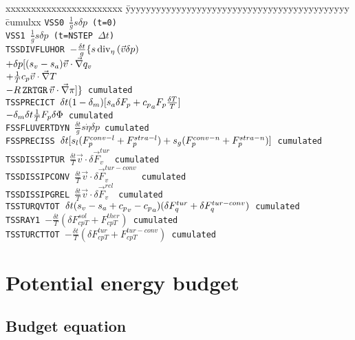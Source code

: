\begin{tabbing}
xxxxxxxxxxxxxxxxxxxxxxx \= yyyyyyyyyyyyyyyyyyyyyyyyyyyyyyyyyyyyyyyyyyyy \= cumulxx \kill
\tt VSS0         \> $\frac{1}{g} s \delta p$ (t=0) \\[1ex]
\tt VSS1         \> $\frac{1}{g} s \delta p$ (t=NSTEP $\Delta t$) \\[1ex]
\tt TSSDIVFLUHOR \> $-\frac{\delta t}{g}\{s\mathop{\rm div}\nolimits_{\eta}\left(\vec{v}\delta p\right)$\\[1ex]
                 \> $+\delta p[(s_v-s_a)\vec{v}\cdot\vec{\nabla} q_v            $\\[1ex]
                 \> $+\frac{1}{T}c_p\vec{v}\cdot\vec{\nabla} T                    $\\[1ex]
                 \> $-R\,\mbox{{\tt ZRTGR}}\,\vec{v}\cdot\vec{\nabla}\pi]\}       $ \> cumulated\\ [1ex]
\tt TSSPRECICT   \> $\delta t(1-\delta_m)[s_a\delta F_{p}+{c_{p}}_{a}F_{p}\frac{\delta T}{T}]$ \\[1ex]
                 \> $-\delta_m \delta t\frac{1}{T}F_{p}\delta\Phi$ \> cumulated\\ [1ex]
\tt FSSFLUVERTDYN\> $\frac{\delta t}{g}s\dot{\eta}\delta p$ \> cumulated\\ [1ex]
\tt FSSPRECISS   \> $\delta t[s_l(F_{p}^{conv-l}+F_{p}^{stra-l})+s_g(F_{p}^{conv-n}+F_{p}^{stra-n})]$ \> cumulated\\ [1ex]
\tt TSSDISSIPTUR \> $\frac{\delta t}{T}\vec{v}\cdot\delta\vec{F}_{v}^{tur}$ \> cumulated\\ [1ex]
\tt TSSDISSIPCONV\> $\frac{\delta t}{T}\vec{v}\cdot\delta\vec{F}_{v}^{tur-conv}$ \> cumulated\\ [1ex]
\tt TSSDISSIPGREL\> $\frac{\delta t}{T}\vec{v}\cdot\delta\vec{F}_{v}^{rel}$ \> cumulated\\ [1ex]
\tt TSSTURQVTOT  \> $\delta t(s_v-s_a+{c_{p}}_{v}-{c_{p}}_{a})(\delta F_{q}^{tur}+\delta F_{q}^{tur-conv})$ \> cumulated\\ [1ex]
\tt TSSRAY1      \> $-\frac{\delta t}{T}(\delta F_{cp T}^{sol}+F_{cp T}^{ther})$ \> cumulated\\ [1ex]
\tt TSSTURCTTOT  \> $-\frac{\delta t}{T}(\delta F_{cp T}^{tur}+F_{cp T}^{tur-conv})$ \> cumulated\\ [1ex]
\end{tabbing}

\section{Potential energy budget}

\subsection*{Budget equation}

